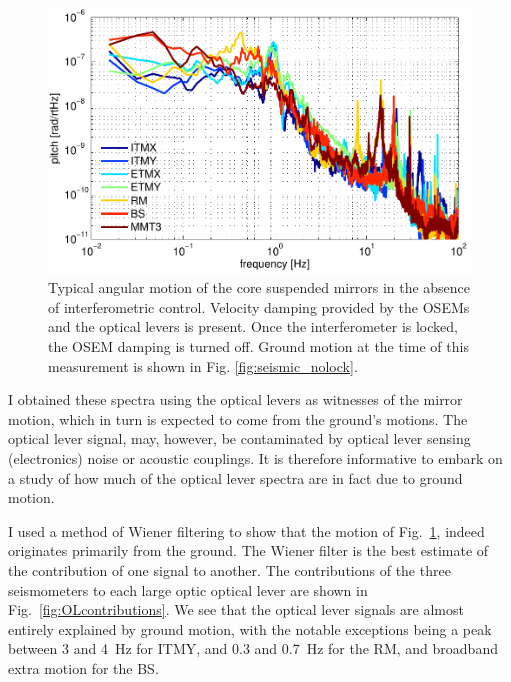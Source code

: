\begin{figure}
\begin{centering}
\includegraphics[width=1.0\columnwidth]{figures/seismic_mirrormotion.pdf}
\caption[Typical angular motion of the core suspended mirrors in the
  absence of interferometric control]{Typical angular motion of the core suspended mirrors in the 
  absence of interferometric control. Velocity damping provided by the
  OSEMs and the optical levers is present. Once the interferometer is locked, the OSEM damping is turned off. Ground motion at the time of this measurement is shown in Fig. \ref{fig:seismic_nolock}.}
\label{fig:seismicMirror}
\end{centering}
\end{figure}


I obtained these spectra using the optical levers as witnesses of the mirror motion, which in turn is expected to come from the ground's motions. The optical lever signal, may, however, be contaminated by optical lever sensing (electronics) noise or acoustic couplings. It is therefore informative to embark on a study of how much of the optical lever spectra are in fact due to ground motion. 

I used a method of Wiener filtering \cite{Wiener1975Extrapolation} to show that the motion of Fig.~\ref{fig:seismicMirror}, indeed originates primarily from the ground. The Wiener filter is the best estimate of the contribution of one signal to another. The contributions of the three seismometers to each large optic optical lever are shown in Fig.~\ref{fig:OLcontributions}. We see that the optical lever signals are almost entirely explained by ground motion, with the notable exceptions being a peak between 3 and 4~Hz for ITMY, and 0.3 and 0.7~Hz for the RM, and broadband extra motion for the BS.


